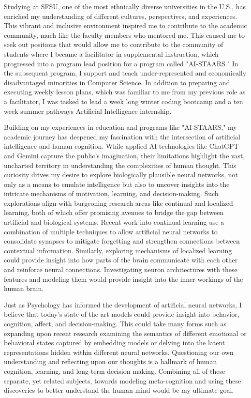 \documentclass[12pt]{article}
\begin{document}
Studying at SFSU, one of the most ethnically diverse universities in the U.S., has enriched my understanding of different cultures,
perspectives, and experiences. This vibrant and inclusive environment inspired me to contribute to the academic community, much like the
faculty members who mentored me. This caused me to seek out positions that would allow me to contribute to the community of students where
I became a facilitator in supplemental instruction, which progressed into a program lead position for a program called "AI-STAARS." In the
subsequent program, I support and teach under-represented and economically disadvantaged minorities in Computer Science.  In addition to
preparing and executing weekly lesson plans, which was familiar to me from my previous role as a facilitator, I was tasked to lead a week
long winter coding bootcamp and a ten week summer pathways Artificial Intelligence internship.

Building on my experiences in education and programs like "AI-STAARS," my academic journey has deepened my fascination with the
intersection of artificial intelligence and human cognition. While applied AI technologies like ChatGPT and Gemini capture the public's
imagination, their limitations highlight the vast, uncharted territory in understanding the complexities of human thought. This curiosity
drives my desire to explore biologically plausible neural networks, not only as a means to emulate intelligence but also to uncover
insights into the intricate mechanisms of motivation, learning, and decision-making. Such explorations align with burgeoning research areas
like continual and localized learning, both of which offer promising avenues to bridge the gap between artificial and biological systems.
Recent work into continual learning use a combination of multiple techniques to allow artificial neural networks to consolidate synapses to
mitigate forgetting and strengthen connections between contextual information. Similarly, exploring mechanisms of localized learning could
provide insight into how parts of the brain communicate with each other and reinforce neural connections. Investigating neuron
architectures with these features and modeling them would provide insight into the inner workings of the human brain.

Just as Psychology has informed the development of artificial neural networks, I believe that today's state-of-the-art models could provide
insight into behavior, cognition, affect, and decision-making. This could take many forms such as expanding upon recent research examining
the semantics of different emotional or behavioral states captured by embedding models or delving into the latent representations hidden
within different neural networks. Questioning our own understanding and reflecting upon our thoughts is a hallmark of human cognition,
learning, and long-term decision making. Combining all of these separate, yet related subjects, towards modeling meta-cognition and using
these discoveries to better understand the human mind would be my ultimate goal.
\end{document}
